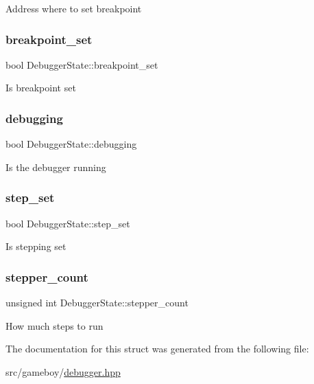 Address where to set breakpoint \mbox{\label{structDebuggerState_a4eeabf35f3cb6144f156a477402b3c5e}} 
\subsubsection{\texorpdfstring{breakpoint\+\_\+set}{breakpoint\_set}}
{\footnotesize\ttfamily bool Debugger\+State\+::breakpoint\+\_\+set}

Is breakpoint set \mbox{\label{structDebuggerState_a20cdc00f0d9054c48f13fb0312df8884}} 
\subsubsection{\texorpdfstring{debugging}{debugging}}
{\footnotesize\ttfamily bool Debugger\+State\+::debugging}

Is the debugger running \mbox{\label{structDebuggerState_a6639effd05e4732748f00d028147b78f}} 
\subsubsection{\texorpdfstring{step\+\_\+set}{step\_set}}
{\footnotesize\ttfamily bool Debugger\+State\+::step\+\_\+set}

Is stepping set \mbox{\label{structDebuggerState_a382993246ed27b0778d3069af4868aa5}} 
\subsubsection{\texorpdfstring{stepper\+\_\+count}{stepper\_count}}
{\footnotesize\ttfamily unsigned int Debugger\+State\+::stepper\+\_\+count}

How much steps to run 

The documentation for this struct was generated from the following file\+:\begin{DoxyCompactItemize}
\item 
src/gameboy/\mbox{\hyperlink{debugger_8hpp}{debugger.\+hpp}}\end{DoxyCompactItemize}
